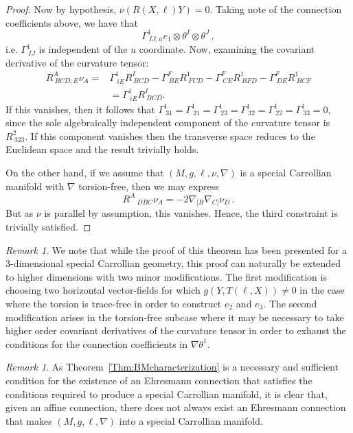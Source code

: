 \documentclass{article}
\newcommand{\ai}{A}
\newcommand{\bb}{B}
\newcommand{\cc}{C}
\newcommand{\dd}{D}
\newcommand{\eee}{E}
\newcommand{\ff}{F}
\newcommand{\ii}{I}
\newcommand{\jj}{J}
\theoremstyle{definition}
\theoremstyle{remark}
\newtheorem{remark}[theorem]{Remark}
\begin{document}
\begin{proof}
Now by hypothesis, $\nu(R(X,\ell) Y) = 0$. Taking note of the connection coefficients above, we have that
$$\Gamma^1_{~\ii \jj,u} e_1 \otimes \theta^\ii \otimes \theta^\jj\,,$$
i.e. $\Gamma^1_{~\ii\jj}$ is independent of the $u$ coordinate. Now, examining the covariant derivative of the curvature tensor:
    \begin{equation}
    \begin{aligned}
        R^\ai_{~\bb\cc\dd;\eee}\nu_\ai =& \Gamma^1_{~i\eee} R^\ii_{~\bb\cc\dd} - \Gamma^\ff_{~\bb\eee} R^1_{~\ff\cc\dd} - \Gamma^\ff_{~\cc\eee} R^1_{~\bb\ff\dd} - \Gamma^\ff_{~\dd\eee} R^1_{~\bb\cc\ff} \\ 
        & = \Gamma^1_{~i\eee} R^\ii_{~\bb\cc\dd}.  
    \end{aligned}
    \end{equation}
    \noindent If this vanishes, then it follows that $\Gamma^1_{~31}=\Gamma^1_{~21} = \Gamma^1_{~23} = \Gamma^1_{~32}=\Gamma^1_{~22}=\Gamma^1_{~33}=0$, since the sole algebraically independent component of the curvature tensor is $R^2_{~323}$. If this component vanishes then the transverse space reduces to the Euclidean space and the result trivially holds. \color{black}

    On the other hand, if we assume that $(M,g,\ell,\nu,\nabla)$ is a special Carrollian manifold with $\nabla$ torsion-free, then we may express
    $$R^\ai{}_{~\dd\bb\cc} \nu_\ai = -2 \nabla_{[\bb} \nabla_{\cc]} \nu_\dd\,.$$
    But as $\nu$ is parallel by assumption, this vanishes. Hence, the third constraint is trivially satisfied.

\end{proof}


\begin{remark}
    We note that while the proof of this theorem has been presented for a 3-dimensional special Carrollian geometry, this proof can naturally be extended to higher dimensions with two minor modifications. The first modification is choosing two horizontal vector-fields for which $g(Y, T(\ell, X)) \neq 0$ in the case where the torsion is trace-free in order to construct $e_2$ and $e_3$. The second modification arises in the torsion-free subcase where it may be necessary to take higher order covariant derivatives of the curvature tensor in order to exhaust the conditions for the connection coefficients in $\nabla \theta^1$.  
\end{remark}

\begin{remark}
    As Theorem~\ref{Thm:BMcharacterization} is a necessary and sufficient condition for the existence of an Ehresmann connection that satisfies the conditions required to produce a special Carrollian manifold, it is clear that, given an affine connection, there does not always exist an Ehresmann connection that makes $(M,g,\ell,\nabla)$ into a special Carrollian manifold.
\end{remark}
\end{document}
